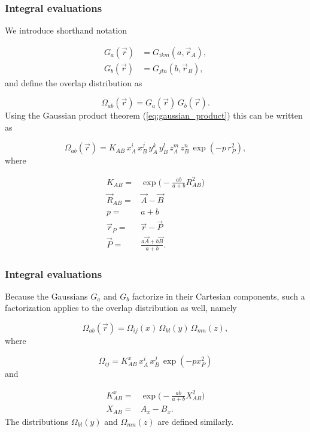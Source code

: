 \documentclass{beamer}
\begin{document}
\begin{frame}
\frametitle{Integral evaluations}

\begin{block}{}

We introduce  shorthand notation

\begin{align}
  G_a(\vec r) & = G_{ikm}(a, \vec r_A), \\
  G_b(\vec r) & = G_{jln}(b, \vec r_B),
\end{align}
and define the overlap distribution  as

\begin{equation}
 \Omega_{ab}(\vec r) = G_a(\vec r)\,G_b(\vec r).
\end{equation}
Using the Gaussian product theorem (\ref{eq:gaussian_product}) this can be written as

\begin{equation}
 \Omega_{ab}(\vec r) = K_{AB}\,x^i_A\,x^j_B\,y^k_A\,y^l_B\,z^m_A\,z^n_B\,\exp(-p\,r^2_P),
\end{equation}
where

\begin{equation}
 \begin{split}
  K_{AB}  = & \exp\Big(-\frac{ab}{a + b}R^2_{AB}\Big) \\
  \vec R_{AB} = &  \vec A - \vec B \\
  p = & a + b\\
  \vec r_P = & \vec r - \vec P \\
  \vec P = & \frac{a\vec A + b\vec B}{a + b}.
 \end{split}
\end{equation}
\end{block}
\end{frame}

\begin{frame}
\frametitle{Integral evaluations}

\begin{block}{}

Because the Gaussians $G_a$ and $G_b$ factorize in their Cartesian components, such a factorization applies to the overlap distribution
as well, namely

\begin{equation}
 \Omega_{ab}(\vec r) = \Omega_{ij}(x)\,\Omega_{kl}(y)\,\Omega_{mn}(z),
\end{equation}
where

\begin{equation}
 \Omega_{ij} = K^x_{AB}\,x^i_A\,x^j_B\,\exp(-px^2_P)
\end{equation}
and

\begin{equation}
\begin{split}
 K^x_{AB} = & \exp\Big(-\frac{ab}{a + b}X^2_{AB}\Big) \\
   X_{AB} = & A_x - B_x.
\end{split}
\end{equation}
The distributions $\Omega_{kl}(y)$ and $\Omega_{mn}(z)$ are defined similarly.
\end{block}
\end{frame}
\end{document}
